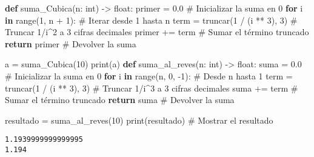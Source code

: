 \documentclass[
  letterpaper,
  DIV=11,
  numbers=noendperiod]{scrartcl}
\newenvironment{Shaded}{\begin{snugshade}}{\end{snugshade}}
\newcommand{\BuiltInTok}[1]{\textcolor[rgb]{0.00,0.23,0.31}{#1}}
\newcommand{\CommentTok}[1]{\textcolor[rgb]{0.37,0.37,0.37}{#1}}
\newcommand{\ControlFlowTok}[1]{\textcolor[rgb]{0.00,0.23,0.31}{\textbf{#1}}}
\newcommand{\DecValTok}[1]{\textcolor[rgb]{0.68,0.00,0.00}{#1}}
\newcommand{\FloatTok}[1]{\textcolor[rgb]{0.68,0.00,0.00}{#1}}
\newcommand{\KeywordTok}[1]{\textcolor[rgb]{0.00,0.23,0.31}{\textbf{#1}}}
\newcommand{\NormalTok}[1]{\textcolor[rgb]{0.00,0.23,0.31}{#1}}
\newcommand{\OperatorTok}[1]{\textcolor[rgb]{0.37,0.37,0.37}{#1}}
\begin{document}
\begin{Shaded}
\begin{Highlighting}[]


\KeywordTok{def}\NormalTok{ suma\_Cubica(n: }\BuiltInTok{int}\NormalTok{) }\OperatorTok{{-}\textgreater{}} \BuiltInTok{float}\NormalTok{:}
\NormalTok{    primer }\OperatorTok{=} \FloatTok{0.0}  \CommentTok{\# Inicializar la suma en 0}
    \ControlFlowTok{for}\NormalTok{ i }\KeywordTok{in} \BuiltInTok{range}\NormalTok{(}\DecValTok{1}\NormalTok{, n }\OperatorTok{+} \DecValTok{1}\NormalTok{):  }\CommentTok{\# Iterar desde 1 hasta n}
\NormalTok{        term }\OperatorTok{=}\NormalTok{ truncar(}\DecValTok{1} \OperatorTok{/}\NormalTok{ (i }\OperatorTok{**} \DecValTok{3}\NormalTok{), }\DecValTok{3}\NormalTok{)  }\CommentTok{\# Truncar 1/i\^{}2 a 3 cifras decimales}
\NormalTok{        primer }\OperatorTok{+=}\NormalTok{ term  }\CommentTok{\# Sumar el término truncado}
    \ControlFlowTok{return}\NormalTok{ primer  }\CommentTok{\# Devolver la suma}

\NormalTok{a }\OperatorTok{=}\NormalTok{ suma\_Cubica(}\DecValTok{10}\NormalTok{)  }
\BuiltInTok{print}\NormalTok{(a)}
\KeywordTok{def}\NormalTok{ suma\_al\_reves(n: }\BuiltInTok{int}\NormalTok{) }\OperatorTok{{-}\textgreater{}} \BuiltInTok{float}\NormalTok{:}
\NormalTok{    suma }\OperatorTok{=} \FloatTok{0.0}  \CommentTok{\# Inicializar la suma en 0}
    \ControlFlowTok{for}\NormalTok{ i }\KeywordTok{in} \BuiltInTok{range}\NormalTok{(n, }\DecValTok{0}\NormalTok{, }\OperatorTok{{-}}\DecValTok{1}\NormalTok{):  }\CommentTok{\# Desde n hasta 1}
\NormalTok{        term }\OperatorTok{=}\NormalTok{ truncar(}\DecValTok{1} \OperatorTok{/}\NormalTok{ (i }\OperatorTok{**} \DecValTok{3}\NormalTok{), }\DecValTok{3}\NormalTok{)  }\CommentTok{\# Truncar 1/i\^{}3 a 3 cifras decimales}
\NormalTok{        suma }\OperatorTok{+=}\NormalTok{ term  }\CommentTok{\# Sumar el término truncado}
    \ControlFlowTok{return}\NormalTok{ suma  }\CommentTok{\# Devolver la suma}

\NormalTok{resultado }\OperatorTok{=}\NormalTok{ suma\_al\_reves(}\DecValTok{10}\NormalTok{)}
\BuiltInTok{print}\NormalTok{(resultado)  }\CommentTok{\# Mostrar el resultado}

\end{Highlighting}
\end{Shaded}

\begin{verbatim}
1.1939999999999995
1.194
\end{verbatim}
\end{document}
